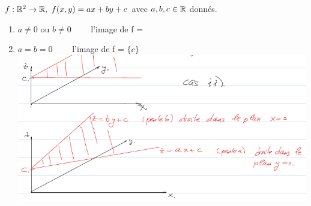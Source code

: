 \documentclass[12pt,a4paper]{article}
\begin{document}
$f:\mathbb{R}^2 \to \mathbb{R}, \ f(x,y) = ax+by+c$ avec $a,b,c \in \mathbb{R}$ donnés.
\begin{enumerate}[label=\roman*)]
	\item $a \neq 0$ ou $b\neq 0 \qquad$ l'image de f = \R
	\item $a=b=0 \qquad$ l'image de f = $\{c\}$\\
	\includegraphics[scale=0.5]{images/deux_droites}
\end{enumerate}
\newpage
\end{document}
